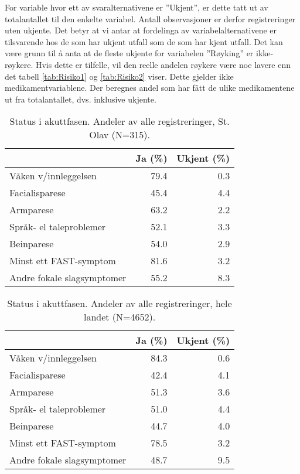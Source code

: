 \documentclass [norsk,a4paper,twoside]{article}\usepackage[]{graphicx}\usepackage[]{color}
\begin{document}
For variable
hvor ett av svaralternativene er ''Ukjent'', er dette tatt ut av totalantallet til den enkelte variabel. 
Antall observasjoner er derfor registreringer uten ukjente. Det betyr at vi
antar at fordelinga av variabelalternativene er tilsvarende hos de som har ukjent utfall som de som har
kjent utfall. Det kan være grunn til å anta at de fleste ukjente for variabelen ''Røyking'' er ikke-røykere.
Hvis dette er tilfelle, vil den reelle andelen røykere være noe lavere enn det tabell \ref{tab:Risiko1}
og \ref{tab:Risiko2} viser. Dette gjelder ikke medikamentvariablene. Der beregnes andel som har fått
de ulike medikamentene ut fra totalantallet, dvs. inklusive ukjente.

\begin{table}[ht]
\centering
\begin{tabular}{lrr}
  \hline
 & Ja (\%) & Ukjent (\%) \\ 
  \hline
Våken v/innleggelsen & 79.4 & 0.3 \\ 
  Facialisparese & 45.4 & 4.4 \\ 
  Armparese & 63.2 & 2.2 \\ 
  Språk- el taleproblemer & 52.1 & 3.3 \\ 
  Beinparese & 54.0 & 2.9 \\ 
  Minst ett FAST-symptom & 81.6 & 3.2 \\ 
  Andre fokale slagsymptomer & 55.2 & 8.3 \\ 
   \hline
\end{tabular}
\caption{Status i akuttfasen. Andeler av alle registreringer, St. Olav (N=315).} 
\label{tab:StatusAkutt1}
\end{table}
\begin{table}[ht]
\centering
\begin{tabular}{lrr}
  \hline
 & Ja (\%) & Ukjent (\%) \\ 
  \hline
Våken v/innleggelsen & 84.3 & 0.6 \\ 
  Facialisparese & 42.4 & 4.1 \\ 
  Armparese & 51.3 & 3.6 \\ 
  Språk- el taleproblemer & 51.0 & 4.4 \\ 
  Beinparese & 44.7 & 4.0 \\ 
  Minst ett FAST-symptom & 78.5 & 3.2 \\ 
  Andre fokale slagsymptomer & 48.7 & 9.5 \\ 
   \hline
\end{tabular}
\caption{Status i akuttfasen. Andeler av alle registreringer, hele landet (N=4652).} 
\label{tab:StatusAkutt2}
\end{table}
\end{document}
